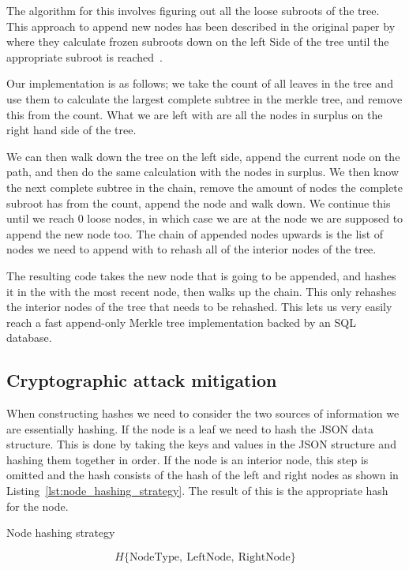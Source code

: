 \documentclass[../Main/thesis.tex]{subfiles}
\begin{document}
The algorithm for this involves figuring out all the loose subroots of the tree.
This approach to append new nodes has been described in the original paper
by~\citeauthor{182788} where they calculate frozen subroots down on the left
Side of the tree until the appropriate subroot is reached~\cite{182788}.

Our implementation is as follows; we take the count of all leaves in the tree and
use them to calculate the largest complete subtree in the merkle tree, and
remove this from the count.  What we are left with are all the nodes in surplus
on the right hand side of the tree.

We can then walk down the tree on the left side, append the current node on the
path, and then do the same calculation with the nodes in surplus. We then know
the next complete subtree in the chain, remove the amount of nodes the complete
subroot has from the count, append the node and walk down. We continue this
until we reach 0 loose nodes, in which case we are at the node we are supposed to
append the new node too. The chain of appended nodes upwards is the list of
nodes we need to append with to rehash all of the interior nodes of the tree.

The resulting code takes the new node that is going to be appended, and hashes
it in the with the most recent node, then walks up the chain. This only rehashes
the interior nodes of the tree that needs to be rehashed. This lets us very
easily reach a fast append-only Merkle tree implementation backed by an SQL
database.


\subsection*{Cryptographic attack mitigation}%
\label{sub:mitigate_attack}
When constructing hashes we need to consider the two sources of information we
are essentially hashing. If the node is a leaf we need to hash the JSON data
structure. This is done by taking the keys and values in the JSON structure and
hashing them together in order. If the node is an interior node, this step is
omitted and the hash consists of the hash of the left and right nodes as shown
in Listing~\ref{lst:node_hashing_strategy}. The result of this is the
appropriate hash for the node.

\begin{listing}[H]
\caption{Node hashing strategy}
\label{lst:node_hashing_strategy}
\begin{equation*}
H\{\text{NodeType},\ \text{LeftNode},\ \text{RightNode}\}
\end{equation*}
\end{listing}
\end{document}

